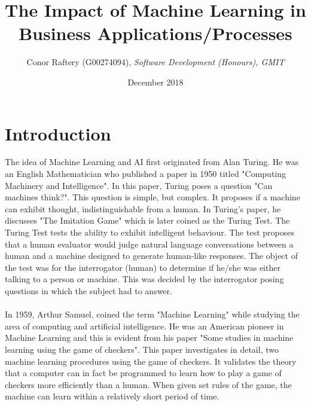\documentclass{article}
\title{The Impact of Machine Learning in Business Applications/Processes}
\author{Conor Raftery (G00274094), \textit{Software Development (Honours), GMIT}}
\date{December 2018}
\begin{document}

\section{Introduction}
The idea of Machine Learning and AI first originated from Alan Turing. He was an English Mathematician who published a paper in 1950 titled "Computing Machinery and Intelligence". In this paper, Turing poses a question "Can machines think?". This question is simple, but complex. It proposes if a machine can exhibit thought, indistinguishable from a human. In Turing's paper, he discusses "The Imitation Game" which is later coined as the Turing Test. The Turing Test tests the ability to exhibit intelligent behaviour. The test proposes that a human evaluator would judge natural language conversations between a human and a machine designed to generate human-like responses. The object of the test was for the interrogator (human) to determine if he/she was either talking to a person or machine. This was decided by the interrogator posing questions in which the subject had to answer.\cite{turing2009computing}
\\\\
In 1959, Arthur Samuel, coined the term "Machine Learning" while studying the area of computing and artificial intelligence. He was an American pioneer in Machine Learning and this is evident from his paper "Some studies in machine learning using the game of checkers". This paper investigates in detail, two machine learning procedures using the game of checkers. It validates the theory that a computer can in fact be programmed to learn how to play a game of checkers more efficiently than a human. When given set rules of the game, the machine can learn within a relatively short period of time.\cite{samuel2000some}
\\\\
\end{document}
